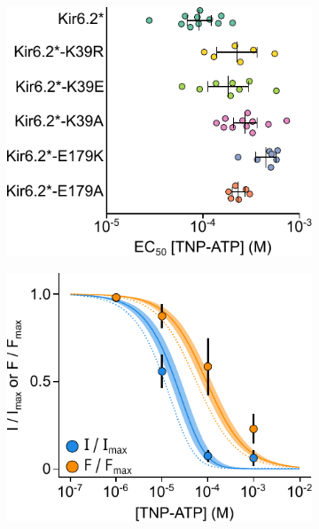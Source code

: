 \begin{figure}[h]
\begin{subfigure}[t]{0.45\textwidth}
	\end{subfigure}
	\hfill
	\begin{subfigure}[t]{0.45\textwidth}
		\caption{}\label{ch5fig:k39_ec50s_1}
		\centering
		\includegraphics[width=\textwidth]{k39_ec50s_1.pdf}
	\end{subfigure}
	\vfill
	\begin{subfigure}[t]{0.3\textwidth}
		\caption{}\label{ch5fig:mwc_k39_1}
		\centering
		\includegraphics[width=\textwidth]{mwc_k39_1.pdf}
	\end{subfigure}
	\hfill
	\begin{subfigure}[t]{0.6\textwidth}

\end{subfigure}
\end{figure}
